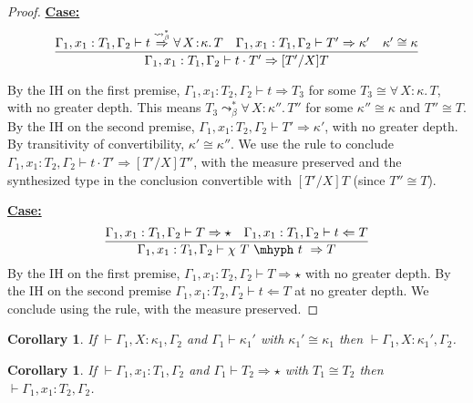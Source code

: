 \documentclass{article}
\newcommand{\abs}[4]{{#1}\, #2\! : \! #3.\, #4}
\newcommand{\tpcheck}[0]{\Leftarrow}
\newcommand{\tpsynth}[0]{\Rightarrow}
\newcommand{\tpsynthleads}[0]{\ensuremath{\overset{\leadsto_\beta^*}{\Rightarrow}}}
\newcommand{\startcase}[1]{\vspace{#1} \noindent\textbf{\underline{Case:}}}
\newtheorem{corollary}[theorem]{Corollary}
\begin{document}
\begin{proof}
  \startcase{.2cm}
  \[
    \infer{
      \Gamma_1,x_1:T_1,\Gamma_2 \vdash t \cdot T' \tpsynth [T'/X]T
    }{
      \Gamma_1,x_1:T_1,\Gamma_2 \vdash t \tpsynthleads
      \abs{\forall}{X}{\kappa}{T}
      & \Gamma_1,x_1:T_1,\Gamma_2 \vdash T' \tpsynth \kappa'
      & \kappa'\cong\kappa
    }
  \]

  By the IH on the first premise, \(\Gamma_1,x_1:T_2,\Gamma_2 \vdash t \tpsynth
  T_3\) for some \(T_3 \cong \abs{\forall}{X}{\kappa}{T}\), with no greater
  depth.
  This means \(T_3 \leadsto_\beta^* \abs{\forall}{X}{\kappa''}{T''}\) for some
  \(\kappa'' \cong \kappa\) and \(T'' \cong T\).
  By the IH on the second premise, \(\Gamma_1,x_1:T_2,\Gamma_2 \vdash T'
  \tpsynth \kappa'\), with no greater depth.
  By transitivity of convertibility, \(\kappa' \cong \kappa''\).
  We use the rule to conclude \(\Gamma_1,x_1:T_2,\Gamma_2 \vdash t \cdot T'
  \tpsynth [T'/X]T''\), with the measure preserved and the synthesized type in
  the conclusion convertible with \([T'/X]T\) (since \(T'' \cong T\)).

  \startcase{.2cm}
  \[
    \infer{
      \Gamma_1,x_1:T_1,\Gamma_2 \vdash \chi\ T\ \mhyph\ t\ \tpsynth T
    }{
      \Gamma_1,x_1:T_1,\Gamma_2 \vdash T \tpsynth \star
      & \Gamma_1,x_1:T_1,\Gamma_2 \vdash t \tpcheck T
    }
  \]
  By the IH on the first premise, \(\Gamma_1,x_1:T_2,\Gamma_2 \vdash T \tpsynth
  \star\) with no greater depth.
  By the IH on the second premise \(\Gamma_1,x_1:T_2,\Gamma_2 \vdash t \tpcheck
  T\) at no greater depth.
  We conclude using the rule, with the measure preserved.
\end{proof}

\begin{corollary}
  \label{cor:ctxt-conv-class}
  If \(\vdash \Gamma_1,X:\kappa_1,\Gamma_2\) and \(\Gamma_1 \vdash \kappa_1'\)
  with \(\kappa_1' \cong \kappa_1\) then \(\vdash \Gamma_1,X:\kappa_1',\Gamma_2\).
\end{corollary}

\begin{corollary}
  \label{cor:ctxt-conv-class2}
  If \(\vdash \Gamma_1,x_1:T_1,\Gamma_2\) and \(\Gamma_1 \vdash T_2 \tpsynth
  \star\) with \(T_1 \cong T_2\) then \(\vdash \Gamma_1,x_1:T_2,\Gamma_2\).
\end{corollary}
\end{document}
